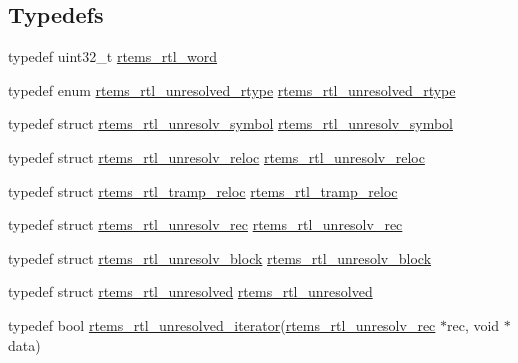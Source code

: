 \subsection*{Typedefs}
\begin{DoxyCompactItemize}
\item 
typedef uint32\+\_\+t \mbox{\hyperlink{rtl-unresolved_8h_a5ab1ca8c94e49686f84f5ccf0731f0e6}{rtems\+\_\+rtl\+\_\+word}}
\item 
typedef enum \mbox{\hyperlink{rtl-unresolved_8h_a4c5be38f1158006e6bc839d4f060ecb6}{rtems\+\_\+rtl\+\_\+unresolved\+\_\+rtype}} \mbox{\hyperlink{rtl-unresolved_8h_add0e4e38190bd032bad41b80139ed2b1}{rtems\+\_\+rtl\+\_\+unresolved\+\_\+rtype}}
\item 
typedef struct \mbox{\hyperlink{structrtems__rtl__unresolv__symbol}{rtems\+\_\+rtl\+\_\+unresolv\+\_\+symbol}} \mbox{\hyperlink{rtl-unresolved_8h_a749f8beccfca47be5b0391cb8a5e7a13}{rtems\+\_\+rtl\+\_\+unresolv\+\_\+symbol}}
\item 
typedef struct \mbox{\hyperlink{structrtems__rtl__unresolv__reloc}{rtems\+\_\+rtl\+\_\+unresolv\+\_\+reloc}} \mbox{\hyperlink{rtl-unresolved_8h_a1c793e6acb096dd94eab9394794a2cf4}{rtems\+\_\+rtl\+\_\+unresolv\+\_\+reloc}}
\item 
typedef struct \mbox{\hyperlink{structrtems__rtl__tramp__reloc}{rtems\+\_\+rtl\+\_\+tramp\+\_\+reloc}} \mbox{\hyperlink{rtl-unresolved_8h_ac699f8d2434c2ba211349130720e58ab}{rtems\+\_\+rtl\+\_\+tramp\+\_\+reloc}}
\item 
typedef struct \mbox{\hyperlink{structrtems__rtl__unresolv__rec}{rtems\+\_\+rtl\+\_\+unresolv\+\_\+rec}} \mbox{\hyperlink{rtl-unresolved_8h_a676d88ade4fb6f0b743967365ae24310}{rtems\+\_\+rtl\+\_\+unresolv\+\_\+rec}}
\item 
typedef struct \mbox{\hyperlink{structrtems__rtl__unresolv__block}{rtems\+\_\+rtl\+\_\+unresolv\+\_\+block}} \mbox{\hyperlink{rtl-unresolved_8h_aa4c375b6902a8ed3fa6d236d8bfbe4c5}{rtems\+\_\+rtl\+\_\+unresolv\+\_\+block}}
\item 
typedef struct \mbox{\hyperlink{structrtems__rtl__unresolved}{rtems\+\_\+rtl\+\_\+unresolved}} \mbox{\hyperlink{rtl-unresolved_8h_ada747123b150ce24a6f9ad574d151e44}{rtems\+\_\+rtl\+\_\+unresolved}}
\item 
typedef bool \mbox{\hyperlink{rtl-unresolved_8h_ab256ab6d71a66bca9ea2f63a86026c9d}{rtems\+\_\+rtl\+\_\+unresolved\+\_\+iterator}}(\mbox{\hyperlink{structrtems__rtl__unresolv__rec}{rtems\+\_\+rtl\+\_\+unresolv\+\_\+rec}} $\ast$rec, void $\ast$data)
\end{DoxyCompactItemize}
